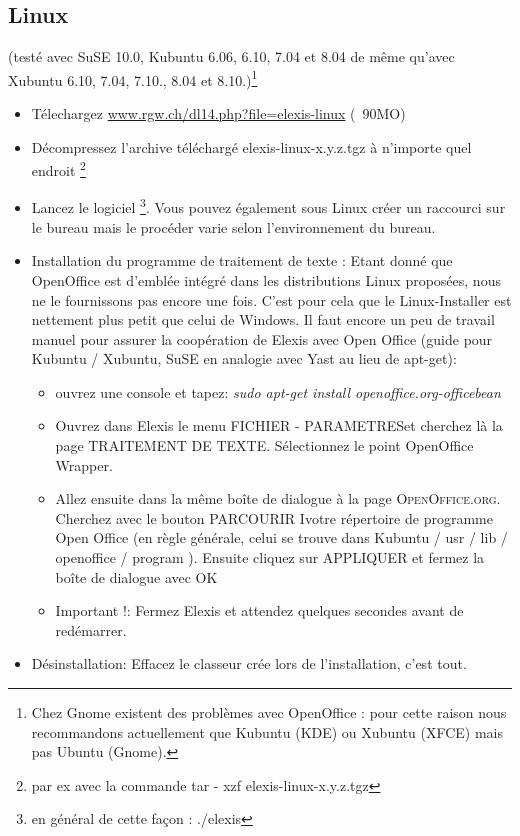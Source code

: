 \subsection{Linux}
(testé avec SuSE 10.0, Kubuntu 6.06, 6.10, 7.04 et 8.04 de même qu'avec  Xubuntu 6.10, 7.04, 7.10., 8.04 et 8.10.)\footnote{Chez Gnome existent des problèmes avec OpenOffice : pour cette raison nous recommandons actuellement que Kubuntu (KDE) ou Xubuntu (XFCE) mais pas Ubuntu (Gnome).}
\begin{itemize}
	\item Télechargez \href{http://www.rgw.ch/dl14.php?file=elexis-linux}{www.rgw.ch/dl14.php?file=elexis-linux} (~90MO)
	\item Décompressez l'archive téléchargé elexis-linux-x.y.z.tgz à n'importe quel endroit \footnote{par ex avec la commande tar - xzf elexis-linux-x.y.z.tgz}
    \item Lancez le logiciel \footnote{en général de cette façon : ./elexis}. Vous pouvez également sous Linux créer un raccourci sur le bureau mais le procéder varie selon l'environnement du bureau.

 	\item Installation du programme de traitement de texte : Etant donné que Open\-Of\-fi\-ce est d'emblée intégré dans les distributions Linux proposées, nous ne le fournissons pas encore une fois. C'est pour cela que le Linux-Installer est nettement plus petit que celui de Windows. Il faut encore un peu de \glqq travail manuel \grqq{} pour assurer la coopération de Elexis avec Open Office (guide pour Kubuntu / Xubuntu, SuSE en analogie avec Yast au lieu de apt-get):
	\begin{itemize}
	 	\item ouvrez une console et tapez: \textit{sudo apt-get in\-stall
	 	openoffice.org-office\-bean}
		\item Ouvrez dans Elexis le menu \textsc{FICHIER - PARAMETRES}et cherchez là la page  \textsc{TRAITEMENT DE TEXTE}. Sélectionnez le point 
		\glqq Open\-Of\-fice Wrap\-per\grqq{}.
		\item Allez ensuite dans la même boîte de dialogue à la page \textsc{OpenOffice.org}.
		Cherchez avec le bouton   \textsc{PARCOURIR} Ivotre répertoire de programme Open Office (en règle générale, celui se trouve dans Kubuntu / usr / lib / openoffice / program ). Ensuite cliquez sur  \textsc{APPLIQUER} et fermez la boîte de dialogue avec  \textsc{OK}
		\item Important !: Fermez Elexis et attendez quelques secondes avant de redémarrer. 
    \end{itemize}
  \item Désinstallation: Effacez le classeur crée lors de l'installation, c'est tout.
\end{itemize}

